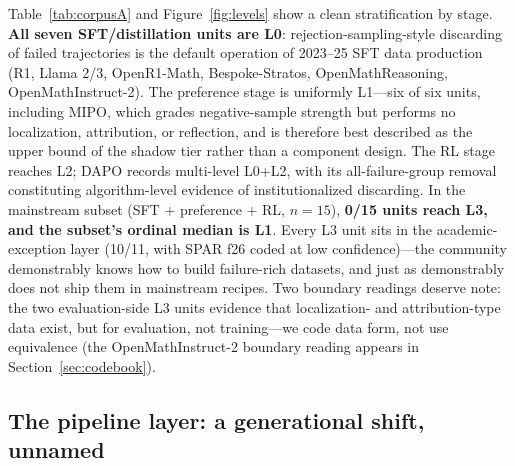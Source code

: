 \documentclass[10pt]{article}
\begin{document}
Table~\ref{tab:corpusA} and Figure~\ref{fig:levels} show a clean stratification by stage. \textbf{All seven SFT/distillation units are L0}: rejection-sampling-style discarding of failed trajectories is the default operation of 2023--25 SFT data production (R1, Llama 2/3, OpenR1-Math, Bespoke-Stratos, OpenMathReasoning, OpenMathInstruct-2). The preference stage is uniformly L1---six of six units, including MIPO, which grades negative-sample strength but performs no localization, attribution, or reflection, and is therefore best described as the upper bound of the shadow tier rather than a component design. The RL stage reaches L2; DAPO records multi-level L0+L2, with its all-failure-group removal constituting algorithm-level evidence of institutionalized discarding. In the mainstream subset (SFT + preference + RL, $n{=}15$), \textbf{0/15 units reach L3, and the subset's ordinal median is L1}. Every L3 unit sits in the academic-exception layer (10/11, with SPAR f26 coded at low confidence)---the community demonstrably knows how to build failure-rich datasets, and just as demonstrably does not ship them in mainstream recipes. Two boundary readings deserve note: the two evaluation-side L3 units evidence that localization- and attribution-type data exist, but for evaluation, not training---we code data form, not use equivalence (the OpenMathInstruct-2 boundary reading appears in Section~\ref{sec:codebook}).

\subsection{The pipeline layer: a generational shift, unnamed}
\end{document}
